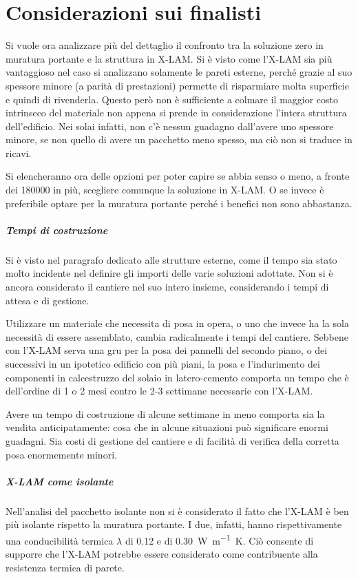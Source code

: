 \chapter{Considerazioni sui finalisti}
Si vuole ora analizzare più del dettaglio il confronto tra la soluzione zero in muratura portante e la struttura in X-LAM. 
Si è visto come l'X-LAM sia più vantaggioso nel caso si analizzano solamente le pareti esterne, perché grazie al suo spessore minore (a parità di prestazioni) permette di risparmiare molta superficie e quindi di rivenderla.
Questo però non è sufficiente a colmare il maggior costo intrinseco del materiale non appena si prende in considerazione l'intera struttura dell'edificio. 
Nei solai infatti, non c'è nessun guadagno dall'avere uno spessore minore, se non quello di avere un pacchetto meno spesso, ma ciò non si traduce in ricavi.

Si elencheranno ora delle opzioni per poter capire se abbia senso o meno, a fronte dei \SI{180000}{\teuro} in più, scegliere comunque la soluzione in X-LAM. 
O se invece è preferibile optare per la muratura portante perché i benefici non sono abbastanza.
\paragraph{Tempi di costruzione}
Si è visto nel paragrafo dedicato alle strutture esterne, come il tempo sia stato molto incidente nel definire gli importi delle varie soluzioni adottate.
Non si è ancora considerato il cantiere nel suo intero insieme, considerando i tempi di attesa e di gestione.

Utilizzare un materiale che necessita di posa in opera, o uno che invece ha la sola necessità di essere assemblato, cambia radicalmente i tempi del cantiere.
Sebbene con l'X-LAM serva una gru per la posa dei pannelli del secondo piano, o dei successivi in un ipotetico edificio con più piani, la posa e l'indurimento dei componenti in calcestruzzo del solaio in latero-cemento comporta un tempo che è dell'ordine di 1 o 2 mesi contro le 2-3 settimane necessarie con l'X-LAM. 

Avere un tempo di costruzione di alcune settimane in meno comporta sia la vendita anticipatamente: cosa che in alcune situazioni può significare enormi guadagni. 
Sia costi di gestione del cantiere e di facilità di verifica della corretta posa enormemente minori.


\paragraph{X-LAM come isolante}
Nell'analisi del pacchetto isolante non si è considerato il fatto che l'X-LAM è ben più isolante rispetto la muratura portante. I due, infatti, hanno rispettivamente una conducibilità termica $\lambda$ di \SI{0.12}{} e di \SI{0.30}{W\per\metre K}.
Ciò consente di supporre che l'X-LAM potrebbe essere considerato come contribuente alla resistenza termica di parete. 

